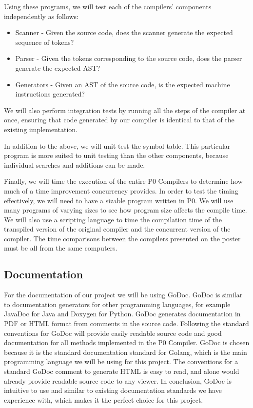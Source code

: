 \documentclass{article}
\begin{document}
Using these programs, we will test each of the compilers' components independently as follows:

\begin{itemize}
  \item Scanner - Given the source code, does the scanner generate the expected
    sequence of tokens?
  \item Parser - Given the tokens corresponding to the source code, does the
    parser generate the expected AST?
  \item Generators - Given an AST of the source code, is the expected machine
    instructions generated?
\end{itemize}

We will also perform integration tests by running all the steps of the compiler
at once, ensuring that code generated by our compiler is identical to that of
the existing implementation.

In addition to the above, we will unit test the symbol table.
This particular program is more suited to unit testing than the other components,
because individual searches and additions can be made.

Finally, we will time the execution of the entire P0 Compilers to determine how much of a
time improvement concurrency provides.
In order to test the timing effectively, we will need to have a sizable program
written in P0.
We will use many programs of varying sizes to see how program size
affects the compile time.
We will also use a scripting language to time the compilation time of the transpiled
version of the original compiler and the concurrent version of the compiler.
The time comparisons between the compilers presented on the poster must be all
from the same computers.

\subsection{Documentation} %

For the documentation of our project we will be using GoDoc. GoDoc is similar to documentation 
generators for other programming languages, for example JavaDoc for Java and Doxygen for Python. 
GoDoc generates documentation in PDF or HTML format from comments in the source code. 
Following the standard conventions for GoDoc will provide easily readable source code and good 
documentation for all methods implemented in the P0 Compiler. GoDoc is chosen because it is the standard documentation standard for Golang, 
which is the main programming language we will be using for this project. The conventions for a standard GoDoc comment to generate HTML
 is easy to read, and alone would already provide readable source code to any viewer. 
 In conclusion, GoDoc is intuitive to use and similar to existing documentation standards we have experience with, 
 which makes it the perfect choice for this project.
 
\end{document}
